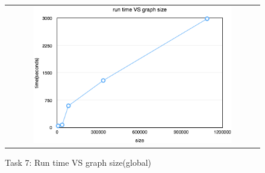 \begin{figure}[!htbf]
\begin{center}
\begin{tabular}{c}
     \includegraphics[width=0.8\textwidth]{FIG/t7_time.png}
\end{tabular}
\caption{Task 7: Run time VS graph size(global)}
\label{t7:globaltime}
\end{center}
\end{figure}

